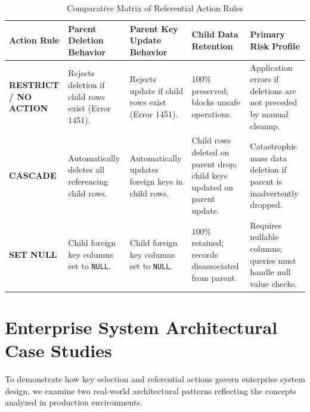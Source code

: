 \documentclass[10pt,journal,compsoc,onecolumn]{IEEEtran}
\begin{document}
\begin{table}[t]
\caption{Comparative Matrix of Referential Action Rules}
\label{tab:action_rules}
\centering
\begin{tabular}{p{2.5cm}p{3.2cm}p{3.5cm}p{3.0cm}p{3.0cm}}
\toprule
\textbf{Action Rule} & \textbf{Parent Deletion Behavior} & \textbf{Parent Key Update Behavior} & \textbf{Child Data Retention} & \textbf{Primary Risk Profile} \\
\midrule
\textbf{RESTRICT / NO ACTION} & Rejects deletion if child rows exist (Error 1451). & Rejects update if child rows exist (Error 1451). & 100\% preserved; blocks unsafe operations. & Application errors if deletions are not preceded by manual cleanup. \\
\midrule
\textbf{CASCADE} & Automatically deletes all referencing child rows. & Automatically updates foreign keys in child rows. & Child rows deleted on parent drop; child keys updated on parent update. & Catastrophic mass data deletion if parent is inadvertently dropped. \\
\midrule
\textbf{SET NULL} & Child foreign key columns set to \texttt{NULL}. & Child foreign key columns set to \texttt{NULL}. & 100\% retained; records disassociated from parent. & Requires nullable columns; queries must handle null value checks. \\
\bottomrule
\end{tabular}
\end{table}

\section{Enterprise System Architectural Case Studies}
\label{sec:case_studies}

To demonstrate how key selection and referential actions govern enterprise system design, we examine two real-world architectural patterns reflecting the concepts analyzed in production environments.
\end{document}
